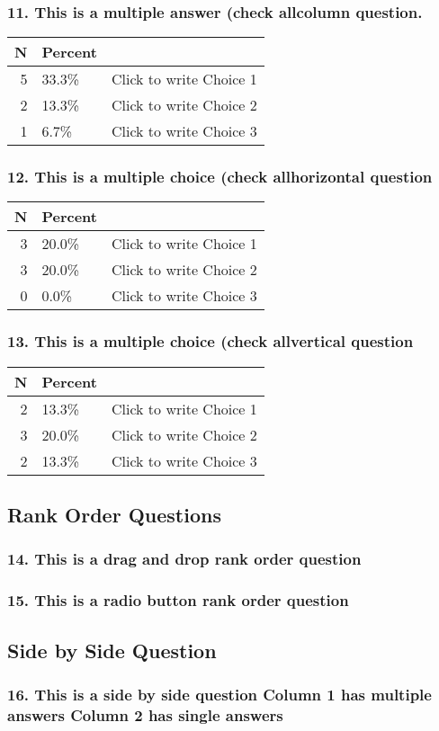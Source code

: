 \documentclass{article}\usepackage[]{graphicx}\usepackage[]{color}
\begin{document}
\subsubsection*{11.
This is a multiple answer (check allcolumn question.}

\begin{tabular}{r|l|l}
\hline
N & Percent & \\
\hline
5 & 33.3\% & Click to write Choice 1\\
\hline
2 & 13.3\% & Click to write Choice 2\\
\hline
1 & 6.7\% & Click to write Choice 3\\
\hline
\end{tabular}


\hfill \break \hfill \break
\subsubsection*{12.
This is a multiple choice (check allhorizontal question}

\begin{tabular}{r|l|l}
\hline
N & Percent & \\
\hline
3 & 20.0\% & Click to write Choice 1\\
\hline
3 & 20.0\% & Click to write Choice 2\\
\hline
0 & 0.0\% & Click to write Choice 3\\
\hline
\end{tabular}


\hfill \break \hfill \break
\subsubsection*{13.
This is a multiple choice (check allvertical question}

\begin{tabular}{r|l|l}
\hline
N & Percent & \\
\hline
2 & 13.3\% & Click to write Choice 1\\
\hline
3 & 20.0\% & Click to write Choice 2\\
\hline
2 & 13.3\% & Click to write Choice 3\\
\hline
\end{tabular}


\hfill \break \hfill \break
\subsection*{Rank Order Questions}
\subsubsection*{14.
This is a drag and drop rank order question}

\hfill \break \hfill \break
\subsubsection*{15.
This is a radio button rank order question}

\hfill \break \hfill \break
\subsection*{Side by Side Question}
\subsubsection*{16.
This is a side by side question Column 1 has multiple answers Column 2 has single answers}

\hfill \break \hfill \break
\end{document}
